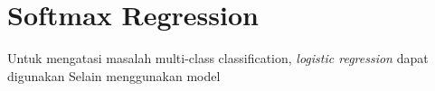 \documentclass[twoside,12pt]{article}
\newcounter{lecnum}
\newcommand{\fig}[3]{
			\vspace{#2}
			\begin{center}
			Figure \thelecnum.#1:~#3
			\end{center}
	}
\newtheorem{theorem}{Theorem}%
\newtheorem{lemma}[theorem]{Lemma}
\newenvironment{proof}{{\bf Proof:}}{\hfill\rule{2mm}{2mm}}
\begin{document}
\section{Softmax Regression}
Untuk mengatasi masalah multi-class classification, \textit{logistic regression} dapat digunakan  Selain menggunakan model 


%
%
%
%
%
%
%
%
%
%
%
%
%
%
\end{document}
